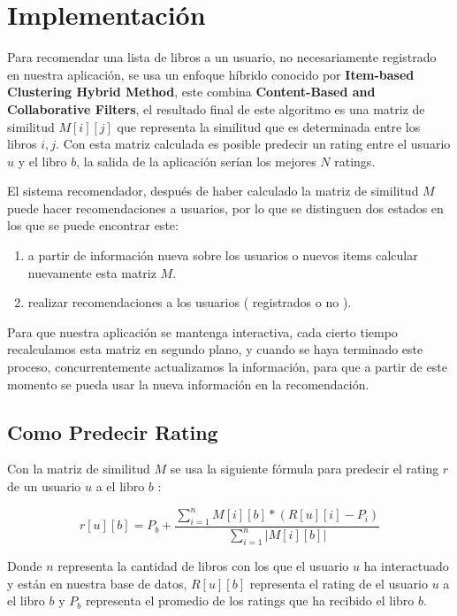 \documentclass[14pt]{extarticle}
\begin{document}
\section{Implementación}

Para recomendar una lista de libros a un usuario, no necesariamente registrado en nuestra aplicación, se usa un enfoque híbrido conocido por \textbf{Item-based Clustering Hybrid Method}, este combina \textbf{Content-Based and Collaborative Filters}, el resultado final de este algoritmo es una matriz de similitud $M[i][j]$ que representa la similitud que es determinada entre los libros $i, j$. Con esta matriz calculada es posible predecir un rating entre el usuario $u$ y el libro $b$, la salida de la aplicación serían los mejores $N$ ratings.   

El sistema recomendador, después de haber calculado la matriz de similitud $M$ puede hacer recomendaciones a usuarios, por lo que se distinguen dos estados en los que se puede encontrar este:

\begin{enumerate}
    \item a partir de información nueva sobre los usuarios o nuevos items calcular nuevamente esta matriz $M$.
    \item realizar recomendaciones a los usuarios ( registrados o no ).
\end{enumerate}

Para que nuestra aplicación se mantenga interactiva, cada cierto tiempo recalculamos esta matriz en segundo plano, y cuando se haya terminado este proceso, concurrentemente actualizamos la información, para que a partir de este momento se pueda usar la nueva información en la recomendación.


\subsection{Como Predecir Rating}  

Con la matriz de similitud $M$ se usa la siguiente fórmula para predecir el rating $r$ de un usuario $u$ a el libro $b$ :

$$r[u][b] = P_b + \frac{\sum_{i = 1}^n M[i][b]*(R[u][i] - P_i)}{\sum_{i = 1}^n | M[i][b] | }$$

Donde $n$ representa la cantidad de libros con los que el usuario $u$ ha interactuado y están en nuestra base de datos, $R[u][b]$ representa el rating de el usuario $u$ a el libro $b$ y $P_b$ representa el promedio de los ratings que ha recibido el libro $b$.
\end{document}
